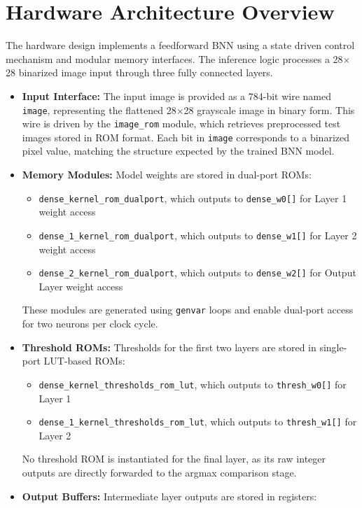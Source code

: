 \documentclass[a4paper,12pt]{report}
\begin{document}
\section{Hardware Architecture Overview}
The hardware design implements a feedforward BNN using a state driven control mechanism and modular memory interfaces. The inference logic processes a 28$\times$28 binarized image input through three fully connected layers.
\begin{itemize}
    \item \textbf{Input Interface:} The input image is provided as a 784-bit wire named \texttt{image}, representing the flattened 28$\times$28 grayscale image in binary form. This wire is driven by the \texttt{image\_rom} module, which retrieves preprocessed test images stored in ROM format. Each bit in \texttt{image} corresponds to a binarized pixel value, matching the structure expected by the trained BNN model.
    \item \textbf{Memory Modules:} Model weights are stored in dual-port ROMs:
    \begin{itemize}
        \item \texttt{dense\_kernel\_rom\_dualport}, which outputs to \texttt{dense\_w0[]} for Layer 1 weight access
        \item \texttt{dense\_1\_kernel\_rom\_dualport}, which outputs to \texttt{dense\_w1[]} for Layer 2 weight access
        \item \texttt{dense\_2\_kernel\_rom\_dualport}, which outputs to \texttt{dense\_w2[]} for Output Layer weight access
    \end{itemize}
    These modules are generated using \texttt{genvar} loops and enable dual-port access for two neurons per clock cycle.
    \item \textbf{Threshold ROMs:} Thresholds for the first two layers are stored in single-port LUT-based ROMs:
    \begin{itemize}
        \item \texttt{dense\_kernel\_thresholds\_rom\_lut}, which outputs to \texttt{thresh\_w0[]} for \newline Layer 1
        \item \texttt{dense\_1\_kernel\_thresholds\_rom\_lut}, which outputs to \texttt{thresh\_w1[]} for Layer 2
    \end{itemize}
    No threshold ROM is instantiated for the final layer, as its raw integer outputs are directly forwarded to the argmax comparison stage.
    \item \textbf{Output Buffers:} Intermediate layer outputs are stored in registers:

\end{itemize}
\end{document}
